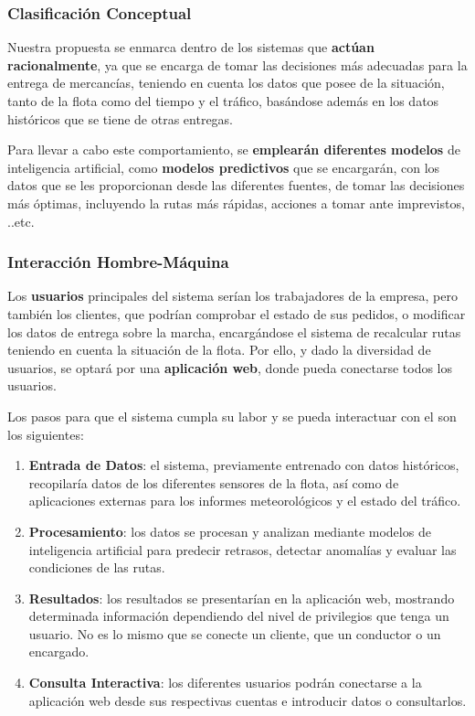 \subsubsection{Clasificación Conceptual}
Nuestra propuesta se enmarca dentro de los sistemas que \textbf{actúan racionalmente}, ya que se encarga de tomar las decisiones más adecuadas para la entrega de mercancías, teniendo en cuenta los datos que posee de la situación, tanto de la flota como del tiempo y el tráfico, basándose además en los datos históricos que se tiene de otras entregas.

Para llevar a cabo este comportamiento, se \textbf{emplearán diferentes modelos} de inteligencia artificial, como \textbf{modelos predictivos} que se encargarán, con los datos que se les proporcionan desde las diferentes fuentes, de tomar las decisiones más óptimas, incluyendo la rutas más rápidas, acciones a tomar ante imprevistos, ..etc.


\subsubsection{Interacción Hombre-Máquina}

Los \textbf{usuarios} principales del sistema serían los trabajadores de la empresa, pero también los clientes, que podrían comprobar el estado de sus pedidos, o modificar los datos de entrega sobre la marcha, encargándose el sistema de recalcular rutas teniendo en cuenta la situación de la flota. Por ello, y dado la diversidad de usuarios, se optará por una \textbf{aplicación web}, donde pueda conectarse todos los usuarios.

Los pasos para que el sistema cumpla su labor y se pueda interactuar con el son los siguientes:

\begin{enumerate}
	\item \textbf{Entrada de Datos}: el sistema, previamente entrenado con datos históricos, recopilaría datos de los diferentes sensores de la flota, así como de aplicaciones externas para los informes meteorológicos y el estado del tráfico.
	
	\item \textbf{Procesamiento}: los datos se procesan y analizan mediante modelos de inteligencia artificial para predecir retrasos, detectar anomalías y evaluar las condiciones de las rutas.
	
	\item \textbf{Resultados}: los resultados se presentarían en la aplicación web, mostrando determinada información dependiendo del nivel de privilegios que tenga un usuario. No es lo mismo que se conecte un cliente, que un conductor o un encargado.
	
	\item \textbf{Consulta Interactiva}: los diferentes usuarios podrán conectarse a la aplicación web desde sus respectivas cuentas e introducir datos o consultarlos.
\end{enumerate}

